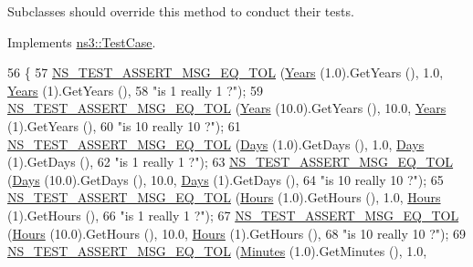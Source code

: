 Subclasses should override this method to conduct their tests. 

Implements \hyperlink{classns3_1_1TestCase_a8ff74680cf017ed42011e4be51917a24}{ns3\+::\+Test\+Case}.


\begin{DoxyCode}
56 \{
57   \hyperlink{group__testing_ga9e7861b56b4e70db3b56044cb7a28e41}{NS\_TEST\_ASSERT\_MSG\_EQ\_TOL} (\hyperlink{group__timecivil_gacba71dd5cfeb7aa46f08a20260247975}{Years} (1.0).GetYears (), 1.0, 
      \hyperlink{group__timecivil_gacba71dd5cfeb7aa46f08a20260247975}{Years} (1).GetYears (),
58                              \textcolor{stringliteral}{"is 1 really 1 ?"});
59   \hyperlink{group__testing_ga9e7861b56b4e70db3b56044cb7a28e41}{NS\_TEST\_ASSERT\_MSG\_EQ\_TOL} (\hyperlink{group__timecivil_gacba71dd5cfeb7aa46f08a20260247975}{Years} (10.0).GetYears (), 10.0, 
      \hyperlink{group__timecivil_gacba71dd5cfeb7aa46f08a20260247975}{Years} (1).GetYears (),
60                              \textcolor{stringliteral}{"is 10 really 10 ?"});
61   \hyperlink{group__testing_ga9e7861b56b4e70db3b56044cb7a28e41}{NS\_TEST\_ASSERT\_MSG\_EQ\_TOL} (\hyperlink{group__timecivil_ga58292fd2de67cc4ccd619ca83d28574b}{Days} (1.0).GetDays (), 1.0, 
      \hyperlink{group__timecivil_ga58292fd2de67cc4ccd619ca83d28574b}{Days} (1).GetDays (),
62                              \textcolor{stringliteral}{"is 1 really 1 ?"});
63   \hyperlink{group__testing_ga9e7861b56b4e70db3b56044cb7a28e41}{NS\_TEST\_ASSERT\_MSG\_EQ\_TOL} (\hyperlink{group__timecivil_ga58292fd2de67cc4ccd619ca83d28574b}{Days} (10.0).GetDays (), 10.0, 
      \hyperlink{group__timecivil_ga58292fd2de67cc4ccd619ca83d28574b}{Days} (1).GetDays (),
64                              \textcolor{stringliteral}{"is 10 really 10 ?"});
65   \hyperlink{group__testing_ga9e7861b56b4e70db3b56044cb7a28e41}{NS\_TEST\_ASSERT\_MSG\_EQ\_TOL} (\hyperlink{group__timecivil_ga6059b5d67fe1e174729c063be4fa2bf7}{Hours} (1.0).GetHours (), 1.0, 
      \hyperlink{group__timecivil_ga6059b5d67fe1e174729c063be4fa2bf7}{Hours} (1).GetHours (),
66                              \textcolor{stringliteral}{"is 1 really 1 ?"});
67   \hyperlink{group__testing_ga9e7861b56b4e70db3b56044cb7a28e41}{NS\_TEST\_ASSERT\_MSG\_EQ\_TOL} (\hyperlink{group__timecivil_ga6059b5d67fe1e174729c063be4fa2bf7}{Hours} (10.0).GetHours (), 10.0, 
      \hyperlink{group__timecivil_ga6059b5d67fe1e174729c063be4fa2bf7}{Hours} (1).GetHours (),
68                              \textcolor{stringliteral}{"is 10 really 10 ?"});
69   \hyperlink{group__testing_ga9e7861b56b4e70db3b56044cb7a28e41}{NS\_TEST\_ASSERT\_MSG\_EQ\_TOL} (\hyperlink{group__timecivil_gaaab039c044ad40238a9d5b556349d0d5}{Minutes} (1.0).GetMinutes (), 1.0, 

\end{DoxyCode}
